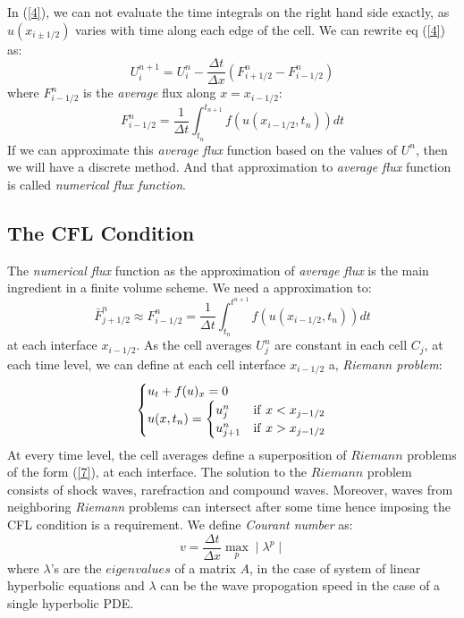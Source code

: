 In (\ref{4}), we can not evaluate the time integrals on the right hand side exactly, as $u(x_{i\pm1/2})$ varies with time along each edge of the cell. We can rewrite eq (\ref{4}) as:
\begin{equation}
U_i^{n+1} = U_i^n - \frac{\Delta t}{\Delta x} \left(F_{i+1/2}^n - F_{i-1/2}^n \right)
\end{equation}
where $F_{i-1/2}^n $ is the \textit{average} flux along $ x = x_{i-1/2}$:
\begin{equation*}
F_{i-1/2}^n  =  \frac{1}{\Delta t} \int_{t_n}^{t_{n+1}} f(u(x_{i-1/2},t_n)) dt
\end{equation*}
If we can approximate this \textit{average flux} function based on the values of $U^n$, then we will have a discrete method. And that approximation to \textit{average flux}  function is called \textit{numerical flux function}.

\subsection{The CFL Condition} \label{cfl}
The \textit{numerical flux} function as the approximation of \textit{average flux} is the main ingredient in a finite volume scheme. We need a approximation to:
\begin{equation}
\bar{F}^n_{j+1/2} \approx F^n_{i-1/2} =  \frac{1}{\Delta t}\int_{t_n}^{t^{n+1}} f(u(x_{i-1/2}, t_n)) dt
\end{equation}
at each interface $x_{i-1/2}$. As the cell averages $U^n_j$ are constant in each cell $C_j$, at each time level, we can define at each cell interface $x_{i-1/2}$ a, \textit{Riemann problem}:
\begin{equation} \label{7}
\begin{cases}
u_t + f(u)_x = 0 \\
u(x, t_n) = & \hspace{-28pt}
\begin{cases}
u^n_j  &  \text{if} \hspace{4pt} x < x_{j-1/2} \\
u^n_{j+1} & \text{if} \hspace{4pt} x > x_{j-1/2}
\end{cases}
\end{cases}
\end{equation}
At every time level, the cell averages define a superposition of $Riemann$ problems of the form (\ref{7}), at each interface. The solution to the $Riemann$ problem consists of shock waves, rarefraction and compound waves. Moreover, waves from neighboring \textit{Riemann} problems can intersect after some time hence imposing the CFL condition is a requirement. We define \textit{Courant number} as:
\begin{equation} \label{8}
v = \frac{\Delta t}{\Delta x} \max_p\mid\lambda^p\mid
\end{equation}
where $\lambda$'s are the $eigenvalues$ of a matrix $A$, in the case of system of linear hyperbolic equations and $\lambda$ can be the wave propogation speed in the case of a single hyperbolic PDE.

